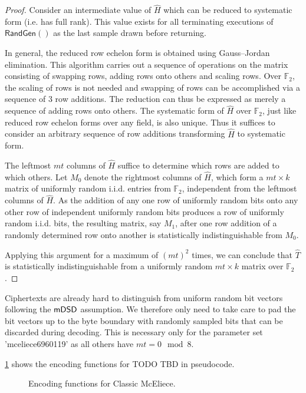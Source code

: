 \begin{proof}
    Consider an intermediate value of $\hat H$ which can be reduced to systematic form (i.e. has full rank). This value exists for all terminating executions of $\textsf{RandGen}()$ as the last sample drawn before returning.

    In general, the reduced row echelon form is obtained using Gauss–Jordan elimination. This algorithm carries out a sequence of operations on the matrix consisting of swapping rows, adding rows onto others and scaling rows.
    Over $\mathbb F_2$, the scaling of rows is not needed and swapping of rows can be accomplished via a sequence of 3 row additions. The reduction can thus be expressed as merely a sequence of adding rows onto others.
    The systematic form of $\hat H$ over $\mathbb F_2$, just like reduced row echelon forms over any field, is also unique. Thus it suffices to consider an arbitrary sequence of row additions transforming $\hat H$ to systematic form.
    
    The leftmost $mt$ columns of $\hat H$ suffice to determine which rows are added to which others.
    Let $M_0$ denote the rightmost columns of $\hat H$, which form a $mt \times k$ matrix of uniformly random i.i.d. entries from $\mathbb F_2$, independent from the leftmost columns of $\hat H$. As the addition of any one row of uniformly random bits onto any other row of independent uniformly random bits produces a row of uniformly random i.i.d. bits, the resulting matrix, say $M_1$, after one row addition of a randomly determined row onto another is statistically indistinguishable from $M_0$.
    
    Applying this argument for a maximum of $(mt)^2$ times, we can conclude that $\hat T$ is statistically indistinguishable from a uniformly random $mt \times k$ matrix over $\mathbb F_2$.
\end{proof}

Ciphertexts are already hard to distinguish from uniform random bit vectors following the $\mathsf{mDSD}$ assumption. We therefore only need to take care to pad the bit vectors up to the byte boundary with randomly sampled bits that can be discarded during decoding. This is necessary only for the parameter set 'mceliece6960119' as all others have $mt = 0 \mod 8$.

\cref{fig:classic-mceliece-encoding} shows the encoding functions for TODO TBD in pseudocode.

\begin{figure}
    
    \caption{Encoding functions for Classic McEliece.}
    \label{fig:classic-mceliece-encoding}
\end{figure}

